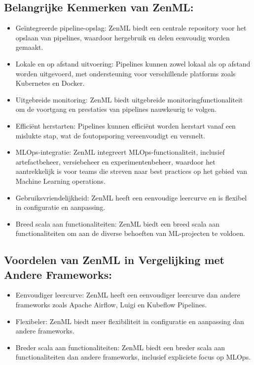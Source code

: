 \subsection{Belangrijke Kenmerken van ZenML:}
\begin{itemize}
    \item Geïntegreerde pipeline-opslag: ZenML biedt een centrale repository voor het opslaan van pipelines, waardoor hergebruik en delen eenvoudig worden gemaakt.
    \item Lokale en op afstand uitvoering: Pipelines kunnen zowel lokaal als op afstand worden uitgevoerd, met ondersteuning voor verschillende platforms zoals Kubernetes en Docker.
    \item Uitgebreide monitoring: ZenML biedt uitgebreide monitoringfunctionaliteit om de voortgang en prestaties van pipelines nauwkeurig te volgen.
    \item Efficiënt herstarten: Pipelines kunnen efficiënt worden herstart vanaf een mislukte stap, wat de foutopsporing vereenvoudigt en versnelt.
    \item MLOps-integratie: ZenML integreert MLOps-functionaliteit, inclusief artefactbeheer, versiebeheer en experimentenbeheer, waardoor het aantrekkelijk is voor teams die streven naar best practices op het gebied van Machine Learning operations.
    \item Gebruiksvriendelijkheid: ZenML heeft een eenvoudige leercurve en is flexibel in configuratie en aanpassing.
    \item Breed scala aan functionaliteiten: ZenML biedt een breed scala aan functionaliteiten om aan de diverse behoeften van ML-projecten te voldoen.
\end{itemize}

\subsection{Voordelen van ZenML in Vergelijking met Andere Frameworks:}
\begin{itemize}
    \item Eenvoudiger leercurve: ZenML heeft een eenvoudiger leercurve dan andere frameworks zoals Apache Airflow, Luigi en Kubeflow Pipelines.
    \item Flexibeler: ZenML biedt meer flexibiliteit in configuratie en aanpassing dan andere frameworks.
    \item Breder scala aan functionaliteiten: ZenML biedt een breder scala aan functionaliteiten dan andere frameworks, inclusief expliciete focus op MLOps.
\end{itemize}


